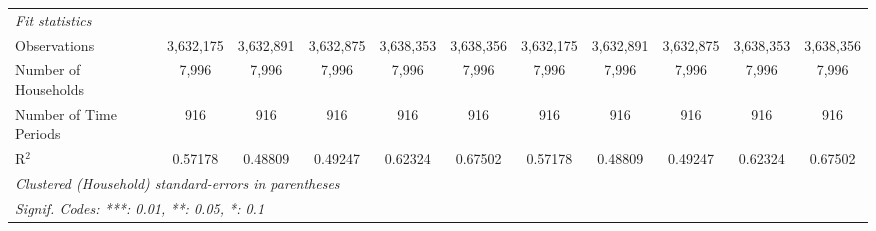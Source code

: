 \begin{table}[htbp]
\begin{tabular}{lcccccccccc}
      \midrule
      \emph{Fit statistics}\\
      Observations                   & 3,632,175      & 3,632,891      & 3,632,875       & 3,638,353       & 3,638,356      & 3,632,175      & 3,632,891      & 3,632,875       & 3,638,353       & 3,638,356\\  
      Number of Households & 7,996          & 7,996          & 7,996           & 7,996           & 7,996          & 7,996          & 7,996          & 7,996           & 7,996           & 7,996\\  
      Number of Time Periods         & 916            & 916            & 916             & 916             & 916            & 916            & 916            & 916             & 916             & 916\\  
      R$^2$                          & 0.57178        & 0.48809        & 0.49247         & 0.62324         & 0.67502        & 0.57178        & 0.48809        & 0.49247         & 0.62324         & 0.67502\\  
      \midrule \midrule
      \multicolumn{11}{l}{\emph{Clustered (Household) standard-errors in parentheses}}\\
      \multicolumn{11}{l}{\emph{Signif. Codes: ***: 0.01, **: 0.05, *: 0.1}}\\
   \end{tabular}
\end{table}


